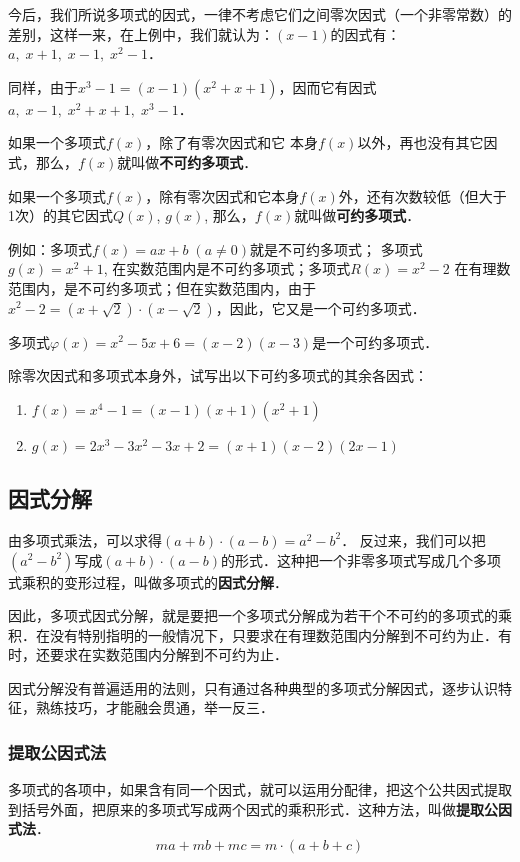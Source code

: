 今后，我们所说多项式的因式，一律不考虑它们之间零次因式（一个非零常数）的差别，这样一来，在上例中，我们就认为：$(x-1)$的因式有：$a,\; x+1,\; x-1,\; x^2-1$．

同样，由于$x^3-1=(x-1)(x^2+x+1)$，因而它有因式$a,\; x-1,\; x^2+x+1,\; x^3-1$．

如果一个多项式$f(x)$，除了有零次因式和它
本身$f(x)$以外，再也没有其它因式，那么，$f(x)$就叫做\textbf{不可约多项式}．

如果一个多项式$f(x)$，除有零次因式和它本身$f(x)$外，还有次数较低（但大于1次）的其它因式$Q(x)$, $g(x)$, 那么，$f(x)$就叫做\textbf{可约多项式}．

例如：多项式$f(x)=ax+b\; (a\ne 0)$就是不可约多项式；
多项式$g(x)=x^2+1$, 在实数范围内是不可约多项式；多项式$R(x)=x^2-2$ 在有理数范围内，是不可约多项式；但在实数范围内，由于$x^2-2=(x+\sqrt{2})\cdot (x-\sqrt{2})$，因此，它又是一个可约多项式．

多项式$\varphi(x)=x^2-5x+6=(x-2)(x-3)$是一个可约多项式．

\begin{ex}
    除零次因式和多项式本身外，试写出以下可约多项式的其余各因式：
    \begin{enumerate}
        \item $f (x) =x^4-1= (x-1) (x+1)(x^2+1)$
        \item $g (x) =2x^3-3x^2-3x+2= (x+1) (x-2)(2x-1)$
    \end{enumerate} 
\end{ex}

\subsection{因式分解}
由多项式乘法，可以求得$(a+b)\cdot (a-b)=a^2-b^2$．
反过来，我们可以把$(a^2-b^2)$写成$(a+b)\cdot (a-b)$的形式．这种把一个非零多项式写成几个多项式乘积的变形过程，叫做多项式的\textbf{因式分解}．

因此，多项式因式分解，就是要把一个多项式分解成为若干个不可约的多项式的乘积．在没有特别指明的一般情况下，只要求在有理数范围内分解到不可约为止．有时，还要求在实数范围内分解到不可约为止．

因式分解没有普遍适用的法则，只有通过各种典型的多项式分解因式，逐步认识特征，熟练技巧，才能融会贯通，举一反三．

\subsubsection{提取公因式法}
多项式的各项中，如果含有同一个因式，就可以运用分配律，把这个公共因式提取到括号外面，把原来的多项式写成两个因式的乘积形式．这种方法，叫做\textbf{提取公因式法}．
\[ma+mb+mc=m\cdot (a+b+c)\]


